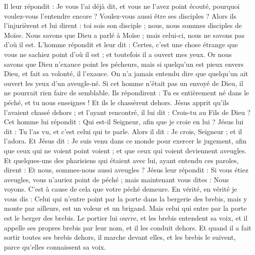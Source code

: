 \begin{multicols}{2}
Il leur répondit : Je vous l'ai déjà dit, et vous ne l'avez point écouté, pourquoi voulez-vous l'entendre encore ? Voulez-vous aussi être ses disciples ?
Alors ils l'injurièrent et lui dirent : toi sois son disciple ; nous, nous sommes disciples de Moïse.
Nous savons que Dieu a parlé à Moïse ; mais celui-ci, nous ne savons pas d'où il est.
L'homme répondit et leur dit : Certes, c'est une chose étrange que vous ne sachiez point d'où il est ; et toutefois il a ouvert mes yeux.
Or nous savons que Dieu n'exauce point les pécheurs, mais si quelqu'un est pieux envers Dieu, et fait sa volonté, il l'exauce.
On n'a jamais entendu dire que quelqu'un ait ouvert les yeux d'un aveugle-né.
Si cet homme n'était pas un envoyé de Dieu, il ne pourrait rien faire de semblable.
Ils répondirent : Tu es entièrement né dans le péché, et tu nous enseignes ! Et ils le chassèrent dehors.
Jésus apprit qu'ils l'avaient chassé dehors ; et l'ayant rencontré, il lui dit : Crois-tu au Fils de Dieu ?
Cet homme lui répondit : Qui est-il Seigneur, afin que je croie en lui ?
Jésus lui dit : Tu l'as vu, et c'est celui qui te parle.
Alors il dit : Je crois, Seigneur ; et il l'adora.
Et Jésus dit : Je suis venu dans ce monde pour exercer le jugement, afin que ceux qui ne voient point voient ; et que ceux qui voient deviennent aveugles.
Et quelques-uns des pharisiens qui étaient avec lui, ayant entendu ces paroles, dirent : Et nous, sommes-nous aussi aveugles ?
Jésus leur répondit : Si vous étiez aveugles, vous n'auriez point de péché ; mais maintenant vous dites : Nous voyons. C'est à cause de cela que votre péché demeure.
\VerseOne{}En vérité, en vérité je vous dis : Celui qui n'entre point par la porte dans la bergerie des brebis, mais y monte par ailleurs, est un voleur et un brigand.
Mais celui qui entre par la porte est le berger des brebis.
Le portier lui ouvre, et les brebis entendent sa voix, et il appelle ses propres brebis par leur nom, et il les conduit dehors.
Et quand il a fait sortir toutes ses brebis dehors, il marche devant elles, et les brebis le suivent, parce qu'elles connaissent sa voix.

\end{multicols}
